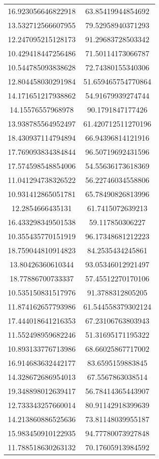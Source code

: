 \begin{table}
\begin{tabular}{cc}
16.923056646822918 & 63.85419944854692 \\
13.532712566607955 & 79.52958940371293 \\
12.247095215128173 & 91.29683728503342 \\
10.429418447256486 & 71.50114173066787 \\
10.544785093838628 & 72.74380155340306 \\
12.804458030291984 & 51.659465754770864 \\
14.171651217938862 & 54.91679939274744 \\
14.15576557968978 & 90.1791847177426 \\
13.938785564952497 & 61.420712511270196 \\
18.430937114794894 & 66.94396814121916 \\
17.769093834384844 & 96.50719692431596 \\
17.574598548854006 & 54.55636173618369 \\
11.041294738326522 & 56.22746034558806 \\
10.931412865051781 & 65.78490826813996 \\
12.2854666435131 & 61.7415072639213 \\
16.433298349501538 & 59.117850306227 \\
10.355435770151919 & 96.17348681212223 \\
18.759044810914823 & 84.2535434245861 \\
13.80426360610344 & 93.05346012921497 \\
18.77886700733337 & 57.45512270170106 \\
10.535150831517976 & 91.3788312805205 \\
11.874162657793986 & 61.544558379302124 \\
17.444018641216353 & 67.23106763803943 \\
11.552498959682246 & 51.31695171195322 \\
10.893133776713986 & 68.66025867717002 \\
16.914683632442177 & 83.6595159883845 \\
14.328672686954013 & 67.5567863038514 \\
19.348898012639417 & 56.78414365443907 \\
12.733343257660014 & 80.91142918399639 \\
14.213860886525636 & 73.81148039955187 \\
15.983450910122935 & 94.77780073927848 \\
11.788518630263132 & 70.17605913984592 \\

\end{tabular}
\end{table}
